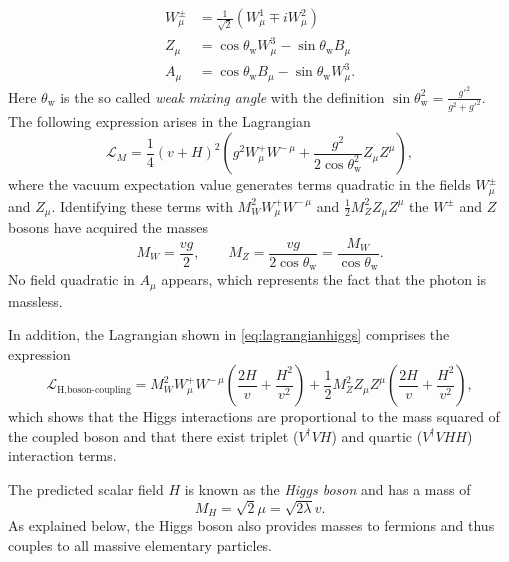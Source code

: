 \begin{align}
  W_\mu^\pm &= \frac{1}{\sqrt{2}} \left( W_\mu^1 \mp iW_\mu^2 \right) \\
  Z_\mu &= \cos\theta_\text{w} W_\mu^3 - \sin\theta_\text{w} B_\mu \\
  A_\mu &= \cos\theta_\text{w} B_\mu - \sin\theta_\text{w} W_\mu^3.
\end{align}
Here $\theta_\text{w}$ is the so called \emph{weak mixing angle} with the definition $\sin\theta_\text{w}^2 = \frac{g'^2}{g^2+g'^2}$.
The following expression arises in the Lagrangian %
\begin{equation}
  \mathcal{L}_M = \frac{1}{4} \left( v + H \right)^2  \left(g^2 W_\mu^+W^{-\,\mu} + \frac{g^2}{2\cos\theta_\text{w}^2} Z_\mu Z^\mu \right),
  \label{eq:lagrangianmasses}
\end{equation}
where the vacuum expectation value generates terms quadratic in the fields $W_\mu^\pm$ and $Z_\mu$. Identifying these terms with $M_W^2 W_\mu^+W^{-\,\mu}$ and $\frac{1}{2} M_Z^2 Z_\mu Z^\mu$ the $W^\pm$ and $Z$ bosons have acquired the masses
\begin{equation}
  M_W = \frac{v g}{2}, \qquad  
  M_Z = \frac{v g}{2\cos\theta_\text{w}} = \frac{M_W}{\cos\theta_\text{w}}.
\end{equation}
No field quadratic in $A_\mu$ appears, which represents the fact that the photon is massless.

In addition, the Lagrangian shown in \cref{eq:lagrangianhiggs} comprises the expression
\begin{equation}
  \mathcal{L}_{\text{H,boson-coupling}} = M_W^2 W_\mu^+W^{-\,\mu} \left( \frac{2H}{v} + \frac{H^2}{v^2} \right) + \frac{1}{2} M_Z^2 Z_\mu Z^\mu \left( \frac{2H}{v} + \frac{H^2}{v^2} \right),
  \label{eq:higgsbosoncoupling}
\end{equation}
which shows that the Higgs interactions are proportional to the mass squared of the coupled boson and that there exist triplet ($V^\dagger VH$) and quartic ($V^\dagger VHH$) interaction terms.



The predicted scalar field $H$ is known as the \emph{Higgs boson} and has a mass of 
\begin{equation}
  M_H = \sqrt{2} \mu = \sqrt{2 \lambda} v.
\end{equation}
As explained below, the Higgs boson also provides masses to fermions and thus couples to all massive elementary particles.

